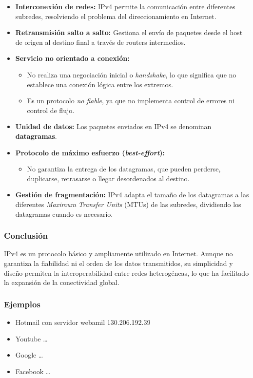 \documentclass[a4paper,12pt]{article}
\begin{document}
\begin{itemize}
    \item \textbf{Interconexión de redes:} IPv4 permite la comunicación entre diferentes subredes, resolviendo el problema del direccionamiento en Internet.
    \item \textbf{Retransmisión salto a salto:} Gestiona el envío de paquetes desde el host de origen al destino final a través de routers intermedios.
    \item \textbf{Servicio no orientado a conexión:}
    \begin{itemize}
        \item No realiza una negociación inicial o \textit{handshake}, lo que significa que no establece una conexión lógica entre los extremos.
        \item Es un protocolo \textit{no fiable}, ya que no implementa control de errores ni control de flujo.
    \end{itemize}
    \item \textbf{Unidad de datos:} Los paquetes enviados en IPv4 se denominan \textbf{datagramas}.
    \item \textbf{Protocolo de máximo esfuerzo (\textit{best-effort}):}
    \begin{itemize}
        \item No garantiza la entrega de los datagramas, que pueden perderse, duplicarse, retrasarse o llegar desordenados al destino.
    \end{itemize}
    \item \textbf{Gestión de fragmentación:} IPv4 adapta el tamaño de los datagramas a las diferentes \textit{Maximum Transfer Units} (MTUs) de las subredes, dividiendo los datagramas cuando es necesario.
\end{itemize}

\subsubsection*{Conclusión}

IPv4 es un protocolo básico y ampliamente utilizado en Internet. Aunque no garantiza la fiabilidad ni el orden de los datos transmitidos, su simplicidad y diseño permiten la interoperabilidad entre redes heterogéneas, lo que ha facilitado la expansión de la conectividad global.

\subsubsection*{Ejemplos}
\begin{itemize}
    \item Hotmail con servidor webamil 130.206.192.39
    \item Youtube \dots
    \item Google \dots
    \item Facebook \dots
\end{itemize}
\end{document}
